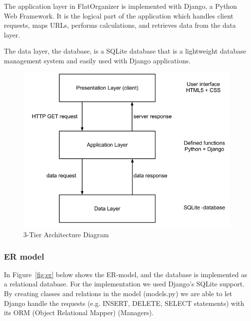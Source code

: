\documentclass{sig-alt-release2}
\begin{document}
The application layer in FlatOrganizer is implemented with Django, a Python Web Framework. It is the logical part of the application which handles client requests, maps URLs, performs calculations, and retrieves data from the data layer.

The data layer, the database, is a SQLite database that is a lightweight database management system and easily used with Django applications.

\begin{figure}[!ht]
\includegraphics[scale=0.7]{3tier}
\caption{ 3-Tier Architecture Diagram}
\label{fig:3tier}
\end{figure}


\subsubsection{ER model}
In Figure~\ref{fig:er} below shows the ER-model, and the database is implemented as a relational database. For the implementation we used Django{’}s SQLite support. By creating classes and relations in the model (models.py) we are able to let Django handle the requests (e.g. INSERT, DELETE, SELECT statements) with its ORM (Object Relational Mapper) (Managers).
\end{document}
